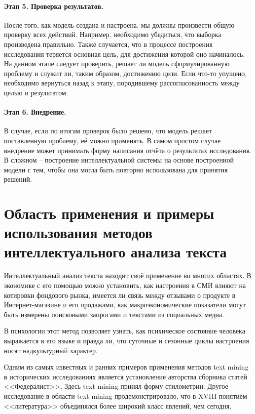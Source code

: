 \paragraph{Этап 5. Проверка результатов.} После того, как модель создана и настроена, мы должны произвести общую проверку всех действий. Например, необходимо убедиться, что выборка произведена правильно. Также случается, что в процессе построения исследования теряется основная цель, для достижения которой оно начиналось. На данном этапе следует проверить, решает ли модель сформулированную проблему и служит ли, таким образом, достижению цели. Если что-то упущено, необходимо вернуться назад к этапу, породившему рассогласованность между целью и результатом.

\paragraph{Этап 6. Внедрение.} В случае, если по итогам проверок было решено, что модель решает поставленную проблему, её можно применять. В самом простом случае внедрение может принимать форму написания отчёта о результатах исследования. В сложном -- построение интеллектуальной системы на основе построенной модели с тем, чтобы она могла быть повторно использована для принятия решений.

\section{Область применения и примеры использования методов интеллектуального анализа текста} \label{sect1_4}

Интеллектуальный анализ текста находит своё применение во многих областях. В экономике с его помощью можно установить, как настроения в СМИ влияют на котировки фондового рынка\cite{Tetlock2007}, имеется ли связь между отзывами о продукте в Интернет-магазине и его продажами\cite{mining_consumer_reviews}, как макроэкономические показатели могут быть измерены поисковыми запросами\cite{Google_econometrics} и текстами из социальных медиа.

В психологии этот метод позволяет узнать, как психическое состояние человека выражается в его языке\cite{psychological_meaning} и правда ли, что суточные и сезонные циклы настроения носят надкультурный характер\cite{seasonal_mood}.

Одним из самых известных и ранних примеров применения методов text mining в исторических исследованиях является установление авторства сборника статей <<Федералист>>\cite{federalist}. Здесь text mining принял форму стилометрии. Другое исследование в области text mining продемонстрировало, что в XVIII понятием <<литература>> объединялся более широкий класс явлений, чем сегодня\cite{encyclopedie}. 

